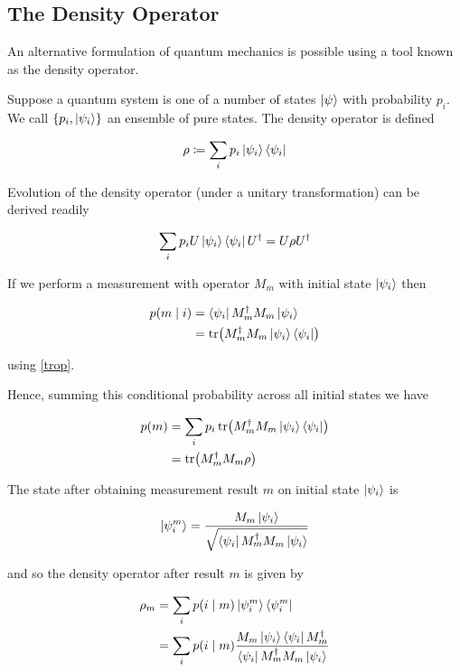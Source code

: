 \documentclass[11pt]{article}
\newcommand\0{\mathbf{0}}
\newcommand\<{\langle}
\renewcommand\>{\rangle}
\begin{document}
\subsection{The Density Operator}

An alternative formulation of quantum mechanics is possible using a tool known as the density operator. 

Suppose a quantum system is one of a number of states $\ket{\psi}$ with probability $p_i$. We call $\{p_i, \ket{\psi_i} \}$ an ensemble of pure states. The density operator is defined

\begin{align*}
\rho \coloneqq \sum_i p_i \ket{\psi_i}\bra{\psi_i}	
\end{align*}

Evolution of the density operator (under a unitary transformation) can be derived readily

\begin{align*}
\sum_i p_i U\ket{\psi_i}\bra{\psi_i}U^\dag = U\rho U^\dag	
\end{align*}

If we perform a measurement with operator $M_m$ with initial state $\ket{\psi_i}$ then

\begin{align*}
p(m\mid i) &= \bra{\psi_i} M_m^\dag M_m \ket{\psi_i} \\
&= \tr(M_m^\dag M_m \ket{\psi_i}\bra{\psi_i})
\end{align*}

using \ref{trop}. 

Hence, summing this conditional probability across all initial states we have

\begin{align*}
	p(m) &= \sum_i p_i \tr(M_m^\dag M_m \ket{\psi_i}\bra{\psi_i}) \\
	&= \tr(M_m^\dag M_m \rho)
\end{align*}

The state after obtaining measurement result $m$ on initial state $\ket{\psi_i}$ is

\begin{align*}
\ket{\psi_i^m} = \frac{M_m \ket{\psi_i}}{\sqrt{\bra{\psi_i}M_m^\dag M_m\ket{\psi_i}}}	
\end{align*}

and so the density operator after result $m$ is given by

\begin{align*}
	\rho_m &= \sum_i p(i \mid m ) \ket{\psi_i^m} \bra{\psi_i^m} \\
	&= \sum_i p(i \mid m )\frac{M_m \ket{\psi_i}\bra{\psi_i}M_m^\dag}{\bra{\psi_i}M_m^\dag M_m\ket{\psi_i}}
\end{align*}
\end{document}
